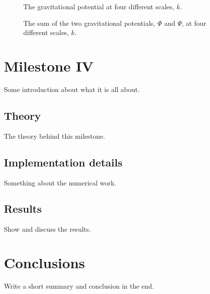 \documentclass{aa}
\begin{document}
\begin{figure}[h!]
   \caption{The gravitational potential at four different scales, $k$.}\label{fig:phi}
\end{figure}

\begin{figure}[h!]
   \caption{The sum of the two gravitational potentials, $\Phi$ and $\Psi$, at four different scales, $k$.}\label{fig:phi_psi}
\end{figure}



\section{Milestone IV}
Some introduction about what it is all about.

\subsection{Theory}
The theory behind this milestone.

\subsection{Implementation details}
Something about the numerical work.

\subsection{Results}
Show and discuss the results.

\section{Conclusions}

Write a short summary and conclusion in the end. 


%


%
\end{document}
